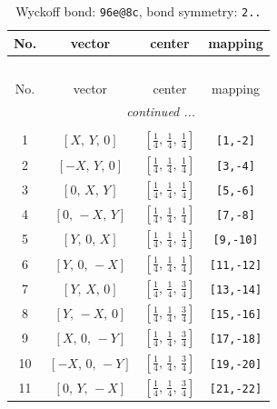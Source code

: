 \documentclass[fleqn,8pt]{jsarticle}
\begin{document}
\begin{longtable}{cccc}
\caption{Wyckoff bond: {\tt 96e@8c}, bond symmetry: {\tt 2..}}
 \\
 \hline \hline
No. & vector & center & mapping \\ \hline \endfirsthead

\multicolumn{3}{l}{\tablename\ \thetable{}} \\
 \hline \hline
No. & vector & center & mapping \\ \hline \endhead

 \hline \hline
\multicolumn{3}{r}{\footnotesize\it continued ...} \\ \endfoot

 \hline \hline
\multicolumn{3}{r}{} \\ \endlastfoot

1 & $\left[ X,\, Y,\, 0 \right]$ & $\left[ \frac{1}{4},\, \frac{1}{4},\, \frac{1}{4} \right]$ & {\tt [1,-2]} \\ \hline
2 & $\left[ - X,\, Y,\, 0 \right]$ & $\left[ \frac{1}{4},\, \frac{1}{4},\, \frac{1}{4} \right]$ & {\tt [3,-4]} \\ \hline
3 & $\left[ 0,\, X,\, Y \right]$ & $\left[ \frac{1}{4},\, \frac{1}{4},\, \frac{1}{4} \right]$ & {\tt [5,-6]} \\ \hline
4 & $\left[ 0,\, - X,\, Y \right]$ & $\left[ \frac{1}{4},\, \frac{1}{4},\, \frac{1}{4} \right]$ & {\tt [7,-8]} \\ \hline
5 & $\left[ Y,\, 0,\, X \right]$ & $\left[ \frac{1}{4},\, \frac{1}{4},\, \frac{1}{4} \right]$ & {\tt [9,-10]} \\ \hline
6 & $\left[ Y,\, 0,\, - X \right]$ & $\left[ \frac{1}{4},\, \frac{1}{4},\, \frac{1}{4} \right]$ & {\tt [11,-12]} \\ \hline
7 & $\left[ Y,\, X,\, 0 \right]$ & $\left[ \frac{1}{4},\, \frac{1}{4},\, \frac{3}{4} \right]$ & {\tt [13,-14]} \\ \hline
8 & $\left[ Y,\, - X,\, 0 \right]$ & $\left[ \frac{1}{4},\, \frac{1}{4},\, \frac{3}{4} \right]$ & {\tt [15,-16]} \\ \hline
9 & $\left[ X,\, 0,\, - Y \right]$ & $\left[ \frac{1}{4},\, \frac{1}{4},\, \frac{3}{4} \right]$ & {\tt [17,-18]} \\ \hline
10 & $\left[ - X,\, 0,\, - Y \right]$ & $\left[ \frac{1}{4},\, \frac{1}{4},\, \frac{3}{4} \right]$ & {\tt [19,-20]} \\ \hline
11 & $\left[ 0,\, Y,\, - X \right]$ & $\left[ \frac{1}{4},\, \frac{1}{4},\, \frac{3}{4} \right]$ & {\tt [21,-22]} \\ \hline

\end{longtable}
\end{document}
